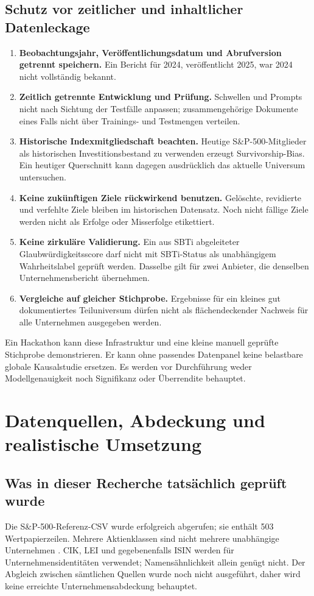 \documentclass[11pt,a4paper]{article}
\begin{document}
\subsection{Schutz vor zeitlicher und inhaltlicher Datenleckage}
\begin{enumerate}
\item \textbf{Beobachtungsjahr, Veröffentlichungsdatum und Abrufversion getrennt speichern.} Ein Bericht für 2024, veröffentlicht 2025, war 2024 nicht vollständig bekannt.
\item \textbf{Zeitlich getrennte Entwicklung und Prüfung.} Schwellen und Prompts nicht nach Sichtung der Testfälle anpassen; zusammengehörige Dokumente eines Falls nicht über Trainings- und Testmengen verteilen.
\item \textbf{Historische Indexmitgliedschaft beachten.} Heutige S\&P-500-Mitglieder als historischen Investitionsbestand zu verwenden erzeugt Survivorship-Bias. Ein heutiger Querschnitt kann dagegen ausdrücklich das aktuelle Universum untersuchen.
\item \textbf{Keine zukünftigen Ziele rückwirkend benutzen.} Gelöschte, revidierte und verfehlte Ziele bleiben im historischen Datensatz. Noch nicht fällige Ziele werden nicht als Erfolge oder Misserfolge etikettiert.
\item \textbf{Keine zirkuläre Validierung.} Ein aus SBTi abgeleiteter Glaubwürdigkeitsscore darf nicht mit SBTi-Status als unabhängigem Wahrheitslabel geprüft werden. Dasselbe gilt für zwei Anbieter, die denselben Unternehmensbericht übernehmen.
\item \textbf{Vergleiche auf gleicher Stichprobe.} Ergebnisse für ein kleines gut dokumentiertes Teiluniversum dürfen nicht als flächendeckender Nachweis für alle Unternehmen ausgegeben werden.
\end{enumerate}
Ein Hackathon kann diese Infrastruktur und eine kleine manuell geprüfte Stichprobe demonstrieren. Er kann ohne passendes Datenpanel keine belastbare globale Kausalstudie ersetzen. Es werden vor Durchführung weder Modellgenauigkeit noch Signifikanz oder Überrendite behauptet.

\section{Datenquellen, Abdeckung und realistische Umsetzung}
\label{sec:data}
\subsection{Was in dieser Recherche tatsächlich geprüft wurde}
Die S\&P-500-Referenz-CSV wurde erfolgreich abgerufen; sie enthält 503 Wertpapierzeilen. Mehrere Aktienklassen sind nicht mehrere unabhängige Unternehmen \cite{constituents}. CIK, LEI und gegebenenfalls ISIN werden für Unternehmensidentitäten verwendet; Namensähnlichkeit allein genügt nicht. Der Abgleich zwischen sämtlichen Quellen wurde noch nicht ausgeführt, daher wird keine erreichte Unternehmensabdeckung behauptet.
\end{document}
